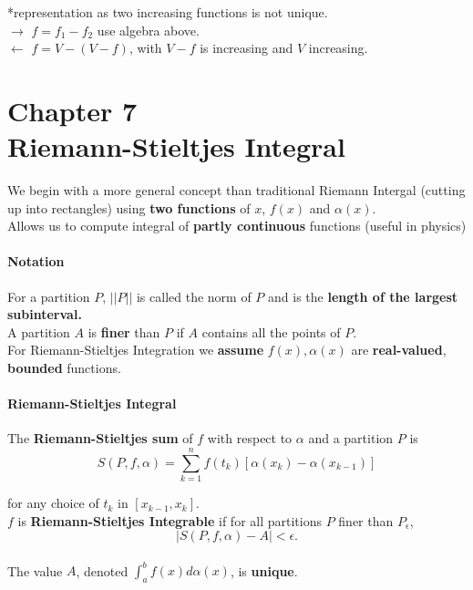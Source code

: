 \documentclass[12pt]{article}
\newcommand{\bt}[1]{\textbf{#1}} %
\newcommand{\gray}[1]{\textcolor[gray]{0.5}{#1}} %
\begin{document}
{*representation as two increasing functions is not unique.\\
\gray{$\rightarrow$ $f = f_1 - f_2$ use algebra above. \\
$\leftarrow$ $f = V - (V - f)$, with $V-f$ is increasing and $V$ increasing. }

\part*{Chapter 7\\ Riemann-Stieltjes Integral}

We begin with a more general concept than traditional Riemann Intergal (cutting up into rectangles) using \bt{two functions} of $x$, $f(x)$ and $\alpha(x)$. \\
Allows us to compute integral of \bt{partly continuous} functions (useful in physics)\\

\subsection*{Notation}

For a partition $P$, $||P||$ is called the norm of $P$ and is the \bt{length of the largest subinterval.}\\

A partition $A$ is \bt{finer} than $P$ if $A$ contains all the points of $P$.\\

For Riemann-Stieltjes Integration we \bt{assume} $f(x), \alpha(x)$ are \bt{real-valued}, \bt{bounded} functions.

\subsection*{Riemann-Stieltjes Integral}
The \bt{Riemann-Stieltjes sum} of $f$ with respect to $\alpha$ and a partition $P$ is
$$S(P, f, \alpha) = \sum_{k=1}^n f(t_k) [\alpha(x_k) - \alpha(x_{k-1})]$$

for any choice of $t_k$ in $[x_{k-1}, x_k]$.\\

$f$ is \bt{Riemann-Stieltjes Integrable} if for all partitions $P$ finer than $P_\epsilon$, 
$$|S(P, f, \alpha) - A| < \epsilon.$$\\

The value $A$, denoted $\int_a^b f(x) d \alpha(x)$, is \bt{unique}.

}
\end{document}
